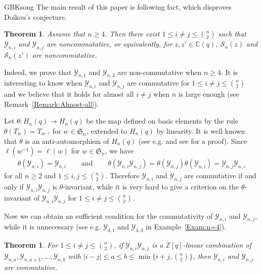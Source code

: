 \documentclass[13pt,a4paper, oneside]{amsart}       %
\numberwithin{equation}{section}
\newtheorem{theorem}[equation]{Theorem}
\theoremstyle{definition}
\theoremstyle{remark}
\begin{document}
\begin{CJK*}{GBK}{song}
The main result of this paper is following fact, which disproves Doikou's conjecture.

\begin{theorem}\label{Theorem:main}
 Assume that  $n\geq 4$.   Then there exist $1\leq i\neq j\leq \binom{n}{2}$ such that $\mathscr{Y}_{n,i}$ and $\mathscr{Y}_{n,j}$ are noncommutative, or equivalently, for $z,z'\in \mathbb{C}(q)$,
  $\mathscr{S}_n(z)$ and $\mathscr{S}_n(z')$ are noncommutative.
\end{theorem}

Indeed, we prove that $\mathscr{Y}_{n,1}$ and $\mathscr{Y}_{n,2}$ are non-commutative when $n\geq 4$. It is interesting to know when $\mathscr{Y}_{n,i}$ and $\mathscr{Y}_{n,j}$ are commutative for $1\leq i\neq j\leq \binom{n}{2}$ and we believe that it holds for almost all $i\neq j$ when $n$ is large enough (see Remark~\ref{Remark:Almost-all}).

Let $\theta: H_n(q)\longrightarrow H_n(q)$ be the map defined on basis elements by the rule $\theta(T_w)=T_{w^{-1}}$ for $w\in \mathfrak{S}_n$, extended to $H_n(q)$ by linearity. It is well known that $\theta$ is an anti-automorphism  of $H_n(q)$ (see e.g. \cite{Dipper-James} and see \cite[Lemma~2.3]{Murphy} for a proof). Since $\ell(w^{-1})=\ell(w)$ for $w\in \mathfrak{S}_n$, we have
 \begin{eqnarray*}
\theta(\mathscr{Y}_{n,i})=\mathscr{Y}_{n,i} &\quad\text{ and }\quad& \theta(\mathscr{Y}_{n,i}\mathscr{Y}_{n,j})=
 \theta(\mathscr{Y}_{n,j})\theta(\mathscr{Y}_{n,i})=
 \mathscr{Y}_{n,j}\mathscr{Y}_{n,i}
 \end{eqnarray*}
for all $n\geq 2$ and $1\leq i,j\leq\binom{n}{2}$.
Therefore $\mathscr{Y}_{n,i}$ and $\mathscr{Y}_{n,j}$ are commutative if and only if $\mathscr{Y}_{n,i}\mathscr{Y}_{n,j}$ is $\theta$-invariant, while it is very hard to give a criterion on the $\theta$-invariant of $\mathscr{Y}_{n,i}\mathscr{Y}_{n,j}$ for $1\leq i\neq j\leq\binom{n}{2}$.

Now we can obtain an sufficient condition for the commutativity of $\mathscr{Y}_{n,i}$ and $\mathscr{Y}_{n,j}$, while it is unnecessary (see e.g.  $\mathscr{Y}_{4,1}$ and $\mathscr{Y}_{4,3}$ in Example~\ref{Exam:n=4}).
\begin{theorem}\label{Them:Comm}For $1\leq i\neq j\leq \binom{n}{2}$,  if $\mathscr{Y}_{n,i}\mathscr{Y}_{n,j}$ is a $\mathbb{Z}[q]$-linear combination of $\mathscr{Y}_{n,a}, \mathscr{Y}_{n,a+1}, \ldots, \mathscr{Y}_{n,b}$ with $|i-j|\leq a\leq b\leq\min\{i+j, \binom{n}{2}\}$, then $\mathscr{Y}_{n,i}$ and $\mathscr{Y}_{n,j}$ are commutative.
\end{theorem}


\end{CJK*}
\end{document}
